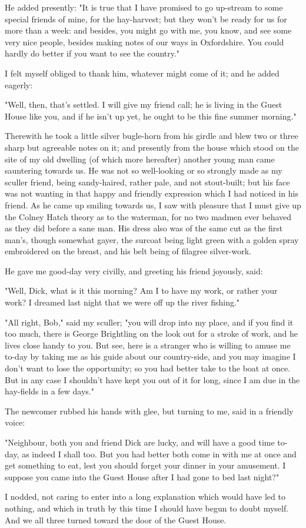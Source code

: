 He added presently: "It is true that I have promised to go up-stream to
some special friends of mine, for the hay-harvest; but they won't be
ready for us for more than a week: and besides, you might go with me,
you know, and see some very nice people, besides making notes of our
ways in Oxfordshire. You could hardly do better if you want to see the
country."

I felt myself obliged to thank him, whatever might come of it; and he
added eagerly:

"Well, then, that's settled. I will give my friend call; he is living in
the Guest House like you, and if he isn't up yet, he ought to be this
fine summer morning."

Therewith he took a little silver bugle-horn from his girdle and blew
two or three sharp but agreeable notes on it; and presently from the
house which stood on the site of my old dwelling (of which more
hereafter) another young man came sauntering towards us. He was not so
well-looking or so strongly made as my sculler friend, being
sandy-haired, rather pale, and not stout-built; but his face was not
wanting in that happy and friendly expression which I had noticed in his
friend. As he came up smiling towards us, I saw with pleasure that I
must give up the Colney Hatch theory as to the waterman, for no two
madmen ever behaved as they did before a sane man. His dress also was of
the same cut as the first man's, though somewhat gayer, the surcoat
being light green with a golden spray embroidered on the breast, and his
belt being of filagree silver-work.

He gave me good-day very civilly, and greeting his friend joyously,
said:

"Well, Dick, what is it this morning? Am I to have my work, or rather
your work? I dreamed last night that we were off up the river fishing."

"All right, Bob," said my sculler; "you will drop into my place, and if
you find it too much, there is George Brightling on the look out for a
stroke of work, and he lives close handy to you. But see, here is a
stranger who is willing to amuse me to-day by taking me as his guide
about our country-side, and you may imagine I don't want to lose the
opportunity; so you had better take to the boat at once. But in any case
I shouldn't have kept you out of it for long, since I am due in the
hay-fields in a few days."

The newcomer rubbed his hands with glee, but turning to me, said in a
friendly voice:

"Neighbour, both you and friend Dick are lucky, and will have a good
time to-day, as indeed I shall too. But you had better both come in with
me at once and get something to eat, lest you should forget your dinner
in your amusement. I suppose you came into the Guest House after I had
gone to bed last night?"

I nodded, not caring to enter into a long explanation which would have
led to nothing, and which in truth by this time I should have begun to
doubt myself. And we all three turned toward the door of the Guest
House.
